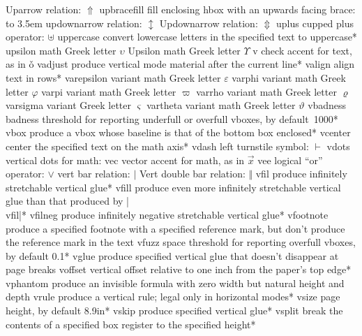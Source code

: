 \capcs Uparrow {relation: $\Uparrow$}{}{}
\capcs upbracefill {fill enclosing hbox with an upwards facing brace:
   \hbox to 3.5em{\upbracefill}}{}{}
\capcs updownarrow {relation: $\updownarrow$}{}{}
\capcs Updownarrow {relation: $\Updownarrow$}{}{}
\capcs uplus {cupped plus operator: $\uplus$}{}{}
\capcs uppercase {convert lowercase letters in the specified text
   to uppercase}*{}
\capcs upsilon {math Greek letter $\upsilon$}{}{}
\capcs Upsilon {math Greek letter $\Upsilon$}{}{}
\capcs v {check accent for text, as in \v o}{}{}
\capcs vadjust {produce vertical mode material after the current line}*{}
\capcs valign {align text in rows}*{}
\capcs varepsilon {variant math Greek letter $\varepsilon$}{}{}
\capcs varphi {variant math Greek letter $\varphi$}{}{}
\capcs varpi {variant math Greek letter $\varpi$}{}{}
\capcs varrho {variant math Greek letter $\varrho$}{}{}
\capcs varsigma {variant Greek letter $\varsigma$}{}{}
\capcs vartheta {variant math Greek letter $\vartheta$}{}{}
\capcs vbadness {badness threshold for reporting underfull or overfull
   vboxes, by default~1000}*{}
\capcs vbox {produce a vbox whose baseline is that of the bottom box
   enclosed}*{}
\capcs vcenter {center the specified text on the math axis}*{}
\capcs vdash {left turnstile symbol: $\vdash$}{}{}
\capcs vdots {vertical dots for math: \smash{$\vdots$}}{}{}
\capcs vec {vector accent for math, as in $\vec x$}{}{}
\capcs vee {logical ``or'' operator: $\vee$}{}{}
\capcs vert {bar relation: $\vert$}{}{}
\capcs Vert {double bar relation: $\Vert$}{}{}
\capcs vfil {produce infinitely stretchable vertical glue}*{}
\capcs vfill {produce even more infinitely stretchable vertical glue
than that produced by |\\vfil|}*{}
\capcs vfilneg {produce infinitely negative stretchable vertical glue}*{}
\capcs vfootnote {produce a specified footnote with a specified
   reference mark, but don't produce the reference mark in the text}{}{}
\capcs vfuzz {space threshold for reporting overfull vboxes, by default 
   0.1\pt}*{}
\capcs vglue {produce specified vertical glue
   that doesn't disappear at page breaks}{}{}
\capcs voffset {vertical offset relative to one inch from the 
   paper's top edge}*{}
\capcs vphantom {produce an invisible formula with zero width but natural
   height and depth}{}{}
\capcs vrule {produce a vertical rule; legal only in horizontal modes}*{}
\capcs vsize {page height, by default 8.9\thinspace in}*{}
\capcs vskip {produce specified vertical glue}*{}
\capcs vsplit {break the contents of a specified box
   register to the specified height}*{}
